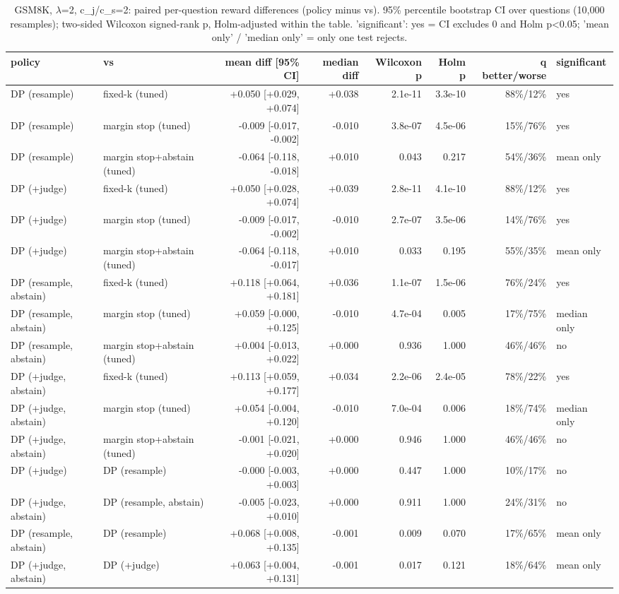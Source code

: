 \begin{table}[t]
\centering
\small
\caption{GSM8K, $\lambda$=2, c\_j/c\_s=2: paired per-question reward differences (policy minus vs). 95\% percentile bootstrap CI over questions (10,000 resamples); two-sided Wilcoxon signed-rank p, Holm-adjusted within the table. 'significant': yes = CI excludes 0 and Holm p<0.05; 'mean only' / 'median only' = only one test rejects.}
\label{tab:significance_gsm8k_lam2}
\begin{tabular}{llrrrrrl}
\toprule
policy & vs & mean diff [95\% CI] & median diff & Wilcoxon p & Holm p & q better/worse & significant \\
\midrule
DP (resample) & fixed-k (tuned) & +0.050 [+0.029, +0.074] & +0.038 & 2.1e-11 & 3.3e-10 & 88\%/12\% & yes \\
DP (resample) & margin stop (tuned) & -0.009 [-0.017, -0.002] & -0.010 & 3.8e-07 & 4.5e-06 & 15\%/76\% & yes \\
DP (resample) & margin stop+abstain (tuned) & -0.064 [-0.118, -0.018] & +0.010 & 0.043 & 0.217 & 54\%/36\% & mean only \\
DP (+judge) & fixed-k (tuned) & +0.050 [+0.028, +0.074] & +0.039 & 2.8e-11 & 4.1e-10 & 88\%/12\% & yes \\
DP (+judge) & margin stop (tuned) & -0.009 [-0.017, -0.002] & -0.010 & 2.7e-07 & 3.5e-06 & 14\%/76\% & yes \\
DP (+judge) & margin stop+abstain (tuned) & -0.064 [-0.118, -0.017] & +0.010 & 0.033 & 0.195 & 55\%/35\% & mean only \\
DP (resample, abstain) & fixed-k (tuned) & +0.118 [+0.064, +0.181] & +0.036 & 1.1e-07 & 1.5e-06 & 76\%/24\% & yes \\
DP (resample, abstain) & margin stop (tuned) & +0.059 [-0.000, +0.125] & -0.010 & 4.7e-04 & 0.005 & 17\%/75\% & median only \\
DP (resample, abstain) & margin stop+abstain (tuned) & +0.004 [-0.013, +0.022] & +0.000 & 0.936 & 1.000 & 46\%/46\% & no \\
DP (+judge, abstain) & fixed-k (tuned) & +0.113 [+0.059, +0.177] & +0.034 & 2.2e-06 & 2.4e-05 & 78\%/22\% & yes \\
DP (+judge, abstain) & margin stop (tuned) & +0.054 [-0.004, +0.120] & -0.010 & 7.0e-04 & 0.006 & 18\%/74\% & median only \\
DP (+judge, abstain) & margin stop+abstain (tuned) & -0.001 [-0.021, +0.020] & +0.000 & 0.946 & 1.000 & 46\%/46\% & no \\
DP (+judge) & DP (resample) & -0.000 [-0.003, +0.003] & +0.000 & 0.447 & 1.000 & 10\%/17\% & no \\
DP (+judge, abstain) & DP (resample, abstain) & -0.005 [-0.023, +0.010] & +0.000 & 0.911 & 1.000 & 24\%/31\% & no \\
DP (resample, abstain) & DP (resample) & +0.068 [+0.008, +0.135] & -0.001 & 0.009 & 0.070 & 17\%/65\% & mean only \\
DP (+judge, abstain) & DP (+judge) & +0.063 [+0.004, +0.131] & -0.001 & 0.017 & 0.121 & 18\%/64\% & mean only \\
\bottomrule
\end{tabular}
\end{table}
